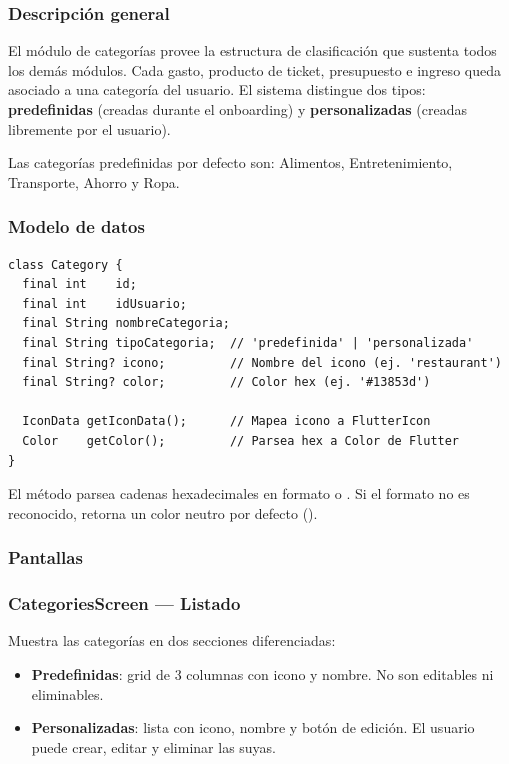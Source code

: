 \subsubsection{Descripción general}

El módulo de categorías provee la estructura de clasificación que sustenta
todos los demás módulos. Cada gasto, producto de ticket, presupuesto e
ingreso queda asociado a una categoría del usuario. El sistema distingue
dos tipos: \textbf{predefinidas} (creadas durante el onboarding) y
\textbf{personalizadas} (creadas libremente por el usuario).

Las categorías predefinidas por defecto son: Alimentos, Entretenimiento,
Transporte, Ahorro y Ropa.

\subsubsection{Modelo de datos}

\begin{lstlisting}[style=dart,
    caption={Modelo de datos Category en Flutter}]
class Category {
  final int    id;
  final int    idUsuario;
  final String nombreCategoria;
  final String tipoCategoria;  // 'predefinida' | 'personalizada'
  final String? icono;         // Nombre del icono (ej. 'restaurant')
  final String? color;         // Color hex (ej. '#13853d')

  IconData getIconData();      // Mapea icono a FlutterIcon
  Color    getColor();         // Parsea hex a Color de Flutter
}
\end{lstlisting}

El método  parsea cadenas hexadecimales en formato
 o . Si el formato no es reconocido,
retorna un color neutro por defecto ().

\subsubsection{Pantallas}

\subsubsection*{CategoriesScreen — Listado}

Muestra las categorías en dos secciones diferenciadas:

\begin{itemize}
  \item \textbf{Predefinidas}: grid de 3 columnas con icono y nombre.
        No son editables ni eliminables.
  \item \textbf{Personalizadas}: lista con icono, nombre y botón de
        edición. El usuario puede crear, editar y eliminar las suyas.
\end{itemize}

